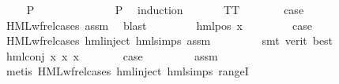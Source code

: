 \begin{isabellebody}
\ \ \isamarkupfalse%
\ {\isachardoublequoteopen}{\isasymAnd}{\isasymphi}{\isachardot}{\kern0pt}\ P\ {\isasymphi}{\isachardoublequoteclose}\ \isamarkupfalse%
{\isacharminus}{\kern0pt}\isanewline
\ \ \ \ \isamarkupfalse%
\ {\isasymphi}\isanewline
\ \ \ \ \isamarkupfalse%
\ {\isachardoublequoteopen}P\ {\isasymphi}{\isachardoublequoteclose}\ \isamarkupfalse%
{\isacharparenleft}{\kern0pt}induction\ {\isasymphi}{\isacharparenright}{\kern0pt}\isanewline
\ \ \ \ \isamarkupfalse%
\ TT\isanewline
\ \ \ \ \isamarkupfalse%
\ \isamarkupfalse%
\ {\isacharquery}{\kern0pt}case\ \isanewline
\ \ \ \ \ \ \isamarkupfalse%
\ HML{\isacharunderscore}{\kern0pt}wf{\isacharunderscore}{\kern0pt}rel{\isachardot}{\kern0pt}cases\ assm\ \isamarkupfalse%
\ blast\isanewline
\ \ \isamarkupfalse%
\isanewline
\ \ \ \ \isamarkupfalse%
\ {\isacharparenleft}{\kern0pt}hml{\isacharunderscore}{\kern0pt}pos\ x{}\ {\isasymphi}{\isacharparenright}{\kern0pt}\isanewline
\ \ \ \ \isamarkupfalse%
\ \isamarkupfalse%
\ {\isacharquery}{\kern0pt}case\ \isanewline
\ \ \ \ \ \ \isamarkupfalse%
\ HML{\isacharunderscore}{\kern0pt}wf{\isacharunderscore}{\kern0pt}rel{\isachardot}{\kern0pt}cases\ hml{\isachardot}{\kern0pt}inject\ hml{\isachardot}{\kern0pt}simps\ assm\ \isanewline
\ \ \ \ \ \ \isamarkupfalse%
\ {\isacharparenleft}{\kern0pt}smt\ {\isacharparenleft}{\kern0pt}verit{\isacharcomma}{\kern0pt}\ best{\isacharparenright}{\kern0pt}{\isacharparenright}{\kern0pt}\isanewline
\ \ \isamarkupfalse%
\isanewline
\ \ \ \ \isamarkupfalse%
\ {\isacharparenleft}{\kern0pt}hml{\isacharunderscore}{\kern0pt}conj\ x{}\ x{}\ x{}{\isacharparenright}{\kern0pt}\isanewline
\ \ \ \ \isamarkupfalse%
\ \isamarkupfalse%
\ {\isacharquery}{\kern0pt}case\ \isanewline
\ \ \ \ \ \ \isamarkupfalse%
\ assm\isanewline
\ \ \ \ \ \ \isamarkupfalse%
\ {\isacharparenleft}{\kern0pt}metis\ HML{\isacharunderscore}{\kern0pt}wf{\isacharunderscore}{\kern0pt}rel{\isachardot}{\kern0pt}cases\ hml{\isachardot}{\kern0pt}inject{\isacharparenleft}{\kern0pt}{}{\isacharparenright}{\kern0pt}\ hml{\isachardot}{\kern0pt}simps{\isacharparenleft}{\kern0pt}{}{\isacharparenright}{\kern0pt}\ rangeI{\isacharparenright}{\kern0pt}\isanewline

\end{isabellebody}
